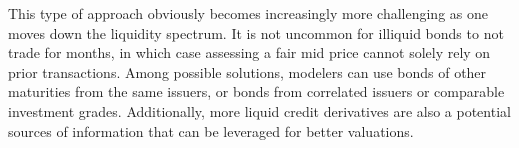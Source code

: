This type of approach obviously becomes increasingly more challenging as one moves down the liquidity spectrum. It is not uncommon for illiquid bonds to not trade for months, in which case assessing a fair mid price cannot solely rely on prior transactions. Among possible solutions, modelers can use bonds of other maturities from the same issuers, or bonds from correlated issuers or comparable investment grades. Additionally, more liquid credit derivatives are also a potential sources of information that can be leveraged for better valuations.